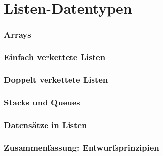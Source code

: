 \documentclass{beamer}
\subtitle{Listen-Datentypen}
\begin{document}
\maketitle

\part{Listen-Datentypen}

\section{Arrays}
	
\section{Einfach verkettete Listen}
	
\section{Doppelt verkettete Listen}
	
\section{Stacks und Queues}
	
	
    
\section{Datensätze in Listen}
	
\section{Zusammenfassung: Entwurfsprinzipien}
	
        
\end{document}
